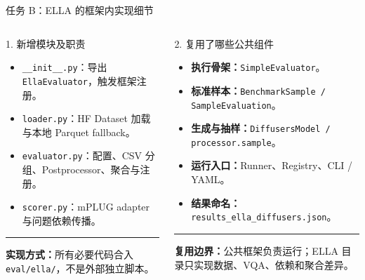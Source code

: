 \documentclass[aspectratio=169,10pt]{beamer}
\begin{document}
\begin{frame}{任务 B：ELLA 的框架内实现细节}
  \begin{columns}[T,onlytextwidth]
      \begin{block}{1. 新增模块及职责}
        \begin{minipage}[c][5.05cm][c]{\linewidth}
          \begin{itemize}\scriptsize
            \item \texttt{\_\_init\_\_.py}：导出 \texttt{EllaEvaluator}，触发框架注册。
            \item \texttt{loader.py}：HF Dataset 加载与本地 Parquet fallback。
            \item \texttt{evaluator.py}：配置、CSV 分组、Postprocessor、聚合与注册。
            \item \texttt{scorer.py}：mPLUG adapter 与问题依赖传播。
          \end{itemize}
          \vspace{0.45em}
          \color{T2IGray}\rule{\linewidth}{0.35pt}\par\vspace{0.3em}
          \scriptsize\textbf{实现方式：}所有必要代码合入 \texttt{eval/ella/}，不是外部独立脚本。
        \end{minipage}
      \end{block}

      \begin{block}{2. 复用了哪些公共组件}
        \begin{minipage}[c][5.05cm][c]{\linewidth}
          \begin{itemize}\scriptsize
            \item \textbf{执行骨架：}\texttt{SimpleEvaluator}。
            \item \textbf{标准样本：}\texttt{BenchmarkSample / SampleEvaluation}。
            \item \textbf{生成与抽样：}\texttt{DiffusersModel / processor.sample}。
            \item \textbf{运行入口：}Runner、Registry、CLI / YAML。
            \item \textbf{结果命名：}\texttt{results\_ella\_diffusers.json}。
          \end{itemize}
          \vspace{0.45em}
          \color{T2IGray}\rule{\linewidth}{0.35pt}\par\vspace{0.3em}
          \scriptsize\textbf{复用边界：}公共框架负责运行；ELLA 目录只实现数据、VQA、依赖和聚合差异。
        \end{minipage}
      \end{block}


\end{columns}
\end{frame}
\end{document}

